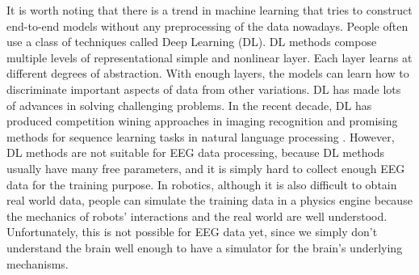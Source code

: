 \documentclass[a4paper,11pt,oneside]{article}
\begin{document}
It is worth noting that there is a trend in machine learning that tries to construct end-to-end models without any preprocessing of the data nowadays. People often use a class of techniques called Deep Learning (DL).  DL methods compose multiple levels of representational simple and nonlinear layer. Each layer learns at different degrees of abstraction. With enough layers, the models can learn how to discriminate important aspects of data from other variations. DL has made lots of advances in solving challenging problems. In the recent decade, DL has produced competition wining approaches in imaging recognition \cite{krizhevsky2012imagenet}\cite{farabet2013learning} and promising methods for sequence learning tasks in natural language processing \cite{bordes2014question} \cite{luong2014addressing}. However, DL methods are not suitable for EEG data processing, because DL methods usually have many free parameters, and it is simply hard to collect enough EEG data for the training purpose. In robotics, although it is also difficult to obtain real world data, people can simulate the training data in a physics engine because the mechanics of robots' interactions and the real world are well understood. Unfortunately, this is not possible for EEG data yet, since we simply don't understand the brain well enough to have a simulator for the brain's underlying mechanisms.
\end{document}
